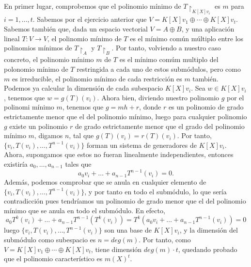 En primer lugar, comprobemos que el polinomio mínimo de \(T\restriction_{K[X]v_i}\) es \(m\) para \(i = 1, \dots, t\). Sabemos por el ejercicio anterior que \(V = K[X]v_1 \oplus \cdots \oplus K[X]v_t\). Sabemos también que, dada un espacio vectorial \(V = A \oplus B\), y una aplicación lineal \(T:V \rightarrow V\), el polinomio mínimo de \(T\) es el mínimo común múltiplo entre los polinomios mínimos de  \(T\restriction_{A}\) y  \(T\restriction_{B}\). Por tanto, volviendo a nuestro caso concreto, el polinomio mínimo \(m\) de \(T\) es el mínimo comúm multiplo del polonomio mínimo de \(T\) restringida a cada uno de estos submódulos, pero como \(m\) es irreducible, el polinomio mínimo de cada restricción es  \(m\) también.\\

Podemos ya calcular la dimensión de cada subespacio \(K[X]v_i\). Sea \(w \in K[X]v_i\), tenemos que  \(w = g(T)(v_i)\). Ahora bien, diviendo nuestro polinomio  \(g\) por el polinomi mínimo  \(m\), tenemos que  \(g = mh + r\), donde \(r\) es un polinomio de grado estrictamente menor que el del polinomio mínimo, luego para cualquier polinomio \(g\) existe un polinomio \(r\) de grado estrictamente menor que el grado del polinomio mínimo \(m\), digamos \(n\), tal que \(g(T)(v_i) = r(T)(v_i)\). Por tanto, \(\{v_i, T(v_i), \dots, T^{n-1}(v_i)\}\) forman un sistema de generadores de \(K[X]v_i\). \\

Ahora, supongamos que estos no fueran linealmente independientes, entonces existiría \(a_0, \dots, a_{n-1}\) tales que
\[
a_0v_i + \dots + a_{n-1}T^{n-1}(v_i) = 0
.\]
Además, podemos comprobar que se anula en cualquier elemento de \(\{v_i, T(v_i), \dots, T^{n-1}(v_i)\}\), y por tanto en todo el submódulo, lo que sería contradicción pues tendríamos un polinomio de grado menor que el del polinomio mínimo que se anula en todo el submódulo. En efecto,
\[
a_0T^k(v_i) + \dots + a_{n-1}T^{n-1}(T^k(v_i)) = T^k(a_0v_i + \dots + a_{n-1}T^{n-1}(v_i)) = 0
\]
luego \(\{v_i, T(v_i), \dots, T^{n-1}(v_i)\}\) son una base de \(K[X]v_i\), y la dimensión del submódulo como subespacio es \(n = deg(m)\). Por tanto, como \(V = K[X]v_1 \oplus \cdots \oplus K[X]v_t\), tiene dimensión \(deg(m) \cdot t\), quedando probado que el polinomio característico es  \(m(X)^t\).
